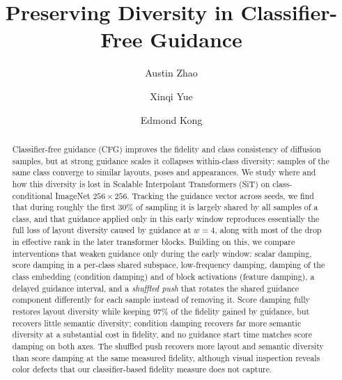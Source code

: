 \documentclass[sigconf,nonacm]{acmart}
\begin{document}
\title{Preserving Diversity in Classifier-Free Guidance}

\author{Austin Zhao}

\author{Xinqi Yue}

\author{Edmond Kong}
\authornotemark[1]

\renewcommand{\shortauthors}{Zhao, Yue, and Kong}

\begin{abstract}
Classifier-free guidance (CFG) improves the fidelity and class consistency of diffusion samples, but at strong guidance scales it collapses within-class diversity: samples of the same class converge to similar layouts, poses and appearances. We study where and how this diversity is lost in Scalable Interpolant Transformers (SiT) on class-conditional ImageNet $256\times256$. Tracking the guidance vector across seeds, we find that during roughly the first 30\% of sampling it is largely shared by all samples of a class, and that guidance applied only in this early window reproduces essentially the full loss of layout diversity caused by guidance at $w=4$, along with most of the drop in effective rank in the later transformer blocks. Building on this, we compare interventions that weaken guidance only during the early window: scalar damping, score damping in a per-class shared subspace, low-frequency damping, damping of the class embedding (condition damping) and of block activations (feature damping), a delayed guidance interval, and a \emph{shuffled push} that rotates the shared guidance component differently for each sample instead of removing it. Score damping fully restores layout diversity while keeping 97\% of the fidelity gained by guidance, but recovers little semantic diversity; condition damping recovers far more semantic diversity at a substantial cost in fidelity, and no guidance start time matches score damping on both axes. The shuffled push recovers more layout and semantic diversity than score damping at the same measured fidelity, although visual inspection reveals color defects that our classifier-based fidelity measure does not capture.
\end{abstract}
\end{document}
